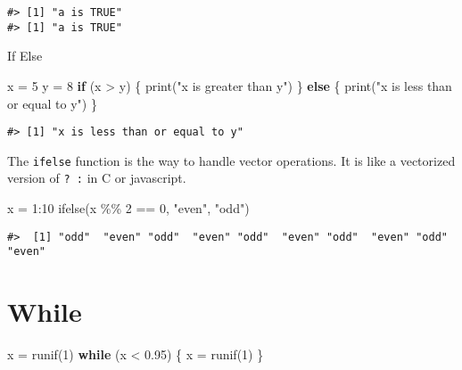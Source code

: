 \documentclass[
]{book}
\newenvironment{Shaded}{\begin{snugshade}}{\end{snugshade}}
\newcommand{\ControlFlowTok}[1]{\textcolor[rgb]{0.13,0.29,0.53}{\textbf{#1}}}
\newcommand{\DecValTok}[1]{\textcolor[rgb]{0.00,0.00,0.81}{#1}}
\newcommand{\FloatTok}[1]{\textcolor[rgb]{0.00,0.00,0.81}{#1}}
\newcommand{\FunctionTok}[1]{\textcolor[rgb]{0.00,0.00,0.00}{#1}}
\newcommand{\NormalTok}[1]{#1}
\newcommand{\OtherTok}[1]{\textcolor[rgb]{0.56,0.35,0.01}{#1}}
\newcommand{\SpecialCharTok}[1]{\textcolor[rgb]{0.00,0.00,0.00}{#1}}
\newcommand{\StringTok}[1]{\textcolor[rgb]{0.31,0.60,0.02}{#1}}
\begin{document}
\begin{verbatim}
#> [1] "a is TRUE"
#> [1] "a is TRUE"
\end{verbatim}

If Else

\begin{Shaded}
\begin{Highlighting}[]
\NormalTok{x }\OtherTok{=} \DecValTok{5}
\NormalTok{y }\OtherTok{=} \DecValTok{8}
\ControlFlowTok{if}\NormalTok{ (x }\SpecialCharTok{\textgreater{}}\NormalTok{ y) \{}
  \FunctionTok{print}\NormalTok{(}\StringTok{"x is greater than y"}\NormalTok{)}
\NormalTok{\} }\ControlFlowTok{else}\NormalTok{ \{}
  \FunctionTok{print}\NormalTok{(}\StringTok{"x is less than or equal to y"}\NormalTok{)}
\NormalTok{\}}
\end{Highlighting}
\end{Shaded}

\begin{verbatim}
#> [1] "x is less than or equal to y"
\end{verbatim}

The \texttt{ifelse} function is the way to handle vector operations. It is like a vectorized version of \texttt{?\ :} in C or javascript.

\begin{Shaded}
\begin{Highlighting}[]
\NormalTok{x }\OtherTok{=} \DecValTok{1}\SpecialCharTok{:}\DecValTok{10}
\FunctionTok{ifelse}\NormalTok{(x }\SpecialCharTok{\%\%} \DecValTok{2} \SpecialCharTok{==} \DecValTok{0}\NormalTok{, }\StringTok{"even"}\NormalTok{, }\StringTok{"odd"}\NormalTok{)}
\end{Highlighting}
\end{Shaded}

\begin{verbatim}
#>  [1] "odd"  "even" "odd"  "even" "odd"  "even" "odd"  "even" "odd"  "even"
\end{verbatim}

\hypertarget{while}{%
\section{While}\label{while}}

\begin{Shaded}
\begin{Highlighting}[]
\NormalTok{x }\OtherTok{=} \FunctionTok{runif}\NormalTok{(}\DecValTok{1}\NormalTok{)}
\ControlFlowTok{while}\NormalTok{ (x }\SpecialCharTok{\textless{}} \FloatTok{0.95}\NormalTok{) \{}
\NormalTok{  x }\OtherTok{=} \FunctionTok{runif}\NormalTok{(}\DecValTok{1}\NormalTok{)}
\NormalTok{\}}
\end{Highlighting}
\end{Shaded}
\end{document}

